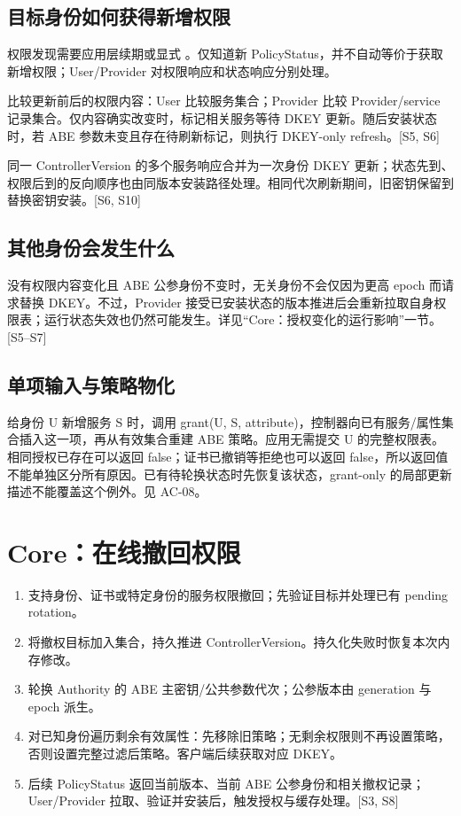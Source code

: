 \subsection{目标身份如何获得新增权限}
权限发现需要应用层续期或显式 。仅知道新 PolicyStatus，并不自动等价于获取新增权限；User/Provider 对权限响应和状态响应分别处理。

 比较更新前后的权限内容：User 比较服务集合；Provider 比较 Provider/service 记录集合。仅内容确实改变时，标记相关服务等待 DKEY 更新。随后安装状态时，若 ABE 参数未变且存在待刷新标记，则执行 DKEY-only refresh。[S5, S6]

同一 ControllerVersion 的多个服务响应合并为一次身份 DKEY 更新；状态先到、权限后到的反向顺序也由同版本安装路径处理。相同代次刷新期间，旧密钥保留到替换密钥安装。[S6, S10]

\subsection{其他身份会发生什么}
没有权限内容变化且 ABE 公参身份不变时，无关身份不会仅因为更高 epoch 而请求替换 DKEY。不过，Provider 接受已安装状态的版本推进后会重新拉取自身权限表；运行状态失效也仍然可能发生。详见“Core：授权变化的运行影响”一节。[S5--S7]



\subsection{单项输入与策略物化}
给身份 U 新增服务 S 时，调用 grant(U, S, attribute)，控制器向已有服务/属性集合插入这一项，再从有效集合重建 ABE 策略。应用无需提交 U 的完整权限表。相同授权已存在可以返回 false；证书已撤销等拒绝也可以返回 false，所以返回值不能单独区分所有原因。已有待轮换状态时先恢复该状态，grant-only 的局部更新描述不能覆盖这个例外。见 AC-08。

\newpage

\section{Core：在线撤回权限}
\begin{enumerate}
\item {} 支持身份、证书或特定身份的服务权限撤回；先验证目标并处理已有 pending rotation。
\item 将撤权目标加入集合，持久推进 ControllerVersion。持久化失败时恢复本次内存修改。
\item 轮换 Authority 的 ABE 主密钥/公共参数代次；公参版本由 generation 与 epoch 派生。
\item 对已知身份遍历剩余有效属性：先移除旧策略；无剩余权限则不再设置策略，否则设置完整过滤后策略。客户端后续获取对应 DKEY。
\item 后续 PolicyStatus 返回当前版本、当前 ABE 公参身份和相关撤权记录；User/Provider 拉取、验证并安装后，触发授权与缓存处理。[S3, S8]
\end{enumerate}

